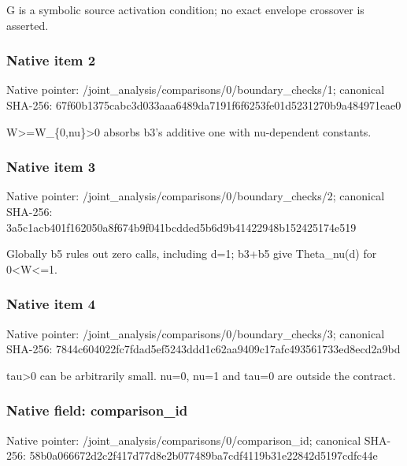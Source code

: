 \documentclass[10pt,a4paper]{article}
\begin{document}
\begingroup\raggedright\sloppy G is a symbolic source activation condition;\allowbreak{} no exact envelope crossover is asserted.\par\endgroup

\subsubsection{Native item 2}
Native pointer: /joint\_\allowbreak{}analysis/comparisons/0/boundary\_\allowbreak{}checks/1; canonical SHA-256: 67f60b1375cabc3d033aaa6489da7191f6f6253fe01d5231270b9a484971eae0

\begingroup\raggedright\sloppy W>=\allowbreak{}W\_\allowbreak{}\{0,\allowbreak{}nu\}>0 absorbs b3's additive one with nu-dependent constants.\par\endgroup

\subsubsection{Native item 3}
Native pointer: /joint\_\allowbreak{}analysis/comparisons/0/boundary\_\allowbreak{}checks/2; canonical SHA-256: 3a5c1acb401f162050a8f674b9f041bcdded5b6d9b41422948b152425174e519

\begingroup\raggedright\sloppy Globally b5 rules out zero calls,\allowbreak{} including d=\allowbreak{}1;\allowbreak{} b3+b5 give Theta\_\allowbreak{}nu(d) for 0<W<=\allowbreak{}1.\par\endgroup

\subsubsection{Native item 4}
Native pointer: /joint\_\allowbreak{}analysis/comparisons/0/boundary\_\allowbreak{}checks/3; canonical SHA-256: 7844c604022fc7fdad5ef5243ddd1c62aa9409c17afc493561733ed8ecd2a9bd

\begingroup\raggedright\sloppy tau>0 can be arbitrarily small. nu=\allowbreak{}0,\allowbreak{} nu=\allowbreak{}1 and tau=\allowbreak{}0 are outside the contract.\par\endgroup

\subsubsection{Native field: comparison\_\allowbreak{}id}
Native pointer: /joint\_\allowbreak{}analysis/comparisons/0/comparison\_\allowbreak{}id; canonical SHA-256: 58b0a066672d2c2f417d77d8e2b077489ba7cdf4119b31e22842d5197cdfc44e
\end{document}
